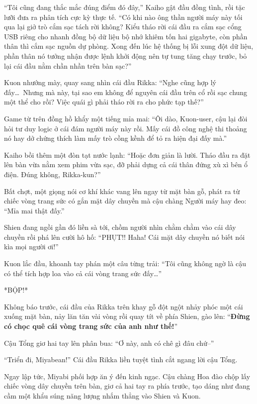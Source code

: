 \documentclass[../main.tex]{subfiles}
\begin{document}
``Tôi cũng đang thắc mắc đúng điểm đó đây,'' Kaiho gật đầu đồng tình, rồi tặc lưỡi đưa ra phân tích cực kỳ thực tế. ``Có khi nào ông thần người máy này tối qua lại giở trò cắm sạc tách rời không? Kiểu tháo rời cái đầu ra cắm sạc cổng USB riêng cho nhanh đồng bộ dữ liệu bộ nhớ khiêm tốn hai gigabyte, còn phần thân thì cắm sạc nguồn dự phòng. Xong đến lúc hệ thống bị lỗi xung đột dữ liệu, phần thân nó tưởng nhận được lệnh khởi động nên tự tung tăng chạy trước, bỏ lại cái đầu nằm chần nhần trên bàn sạc?''

Kuon nhướng mày, quay sang nhìn cái đầu Rikka: ``Nghe cũng hợp lý đấy\dots\ Nhưng mà này, tại sao em không để nguyên cái đầu trên cổ rồi sạc chung một thể cho rồi? Việc quái gì phải tháo rời ra cho phức tạp thế?''

Game từ trên đồng hồ khẩy một tiếng mỉa mai: ``Ôi dào, Kuon-user, cậu lại đòi hỏi tư duy logic ở cái đám người máy này rồi. Mấy cái đồ công nghệ thi thoảng nó hay dở chứng thích làm mấy trò cồng kềnh để tỏ ra hiện đại đấy mà.''

Kaiho bồi thêm một đòn tạt nước lạnh: ``Hoặc đơn giản là lười. Tháo đầu ra đặt lên bàn vừa nằm xem phim vừa sạc, đỡ phải dựng cả cái thân đứng xù xì bên ổ điện. Đúng không, Rikka-kun?''

Bất chợt, một giọng nói cơ khí khác vang lên ngay từ mặt bàn gỗ, phát ra từ chiếc vòng trang sức có gắn mặt dây chuyền mà cậu chàng Người máy hay đeo: ``Mỉa mai thật đấy.''

Shien đang ngồi gần đó liền sà tới, chồm người nhìn chằm chằm vào cái dây chuyền rồi phá lên cười hô hố: ``PHỤT!! Haha! Cái mặt dây chuyền nó biết nói kìa mọi người ơi!''


Kuon lắc đầu, khoanh tay phán một câu từng trải: ``Tôi cũng không ngờ là cậu có thể tích hợp loa vào cả cái vòng trang sức đấy\dots''

*BỘP!*

Không báo trước, cái đầu của Rikka trên khay gỗ đột ngột nhảy phóc một cái xuống mặt bàn, nảy lăn tăn vài vòng rồi quay tít về phía Shien, gào lên: ``\textbf{Đừng có chọc quê cái vòng trang sức của anh như thế!}''

Cậu Tổng giơ hai tay lên phân bua: ``Ơ này, anh có chê gì đâu chứ--''

``Triển đi, Miyabean!'' Cái đầu Rikka liền tuyệt tình cắt ngang lời cậu Tổng.

Ngay lập tức, Miyabi phối hợp ăn ý đến kinh ngạc. Cậu chàng Hoa đào chộp lấy chiếc vòng dây chuyền trên bàn, giơ cả hai tay ra phía trước, tạo dáng như đang cầm một khẩu súng năng lượng nhắm thẳng vào Shien và Kuon.
\end{document}
